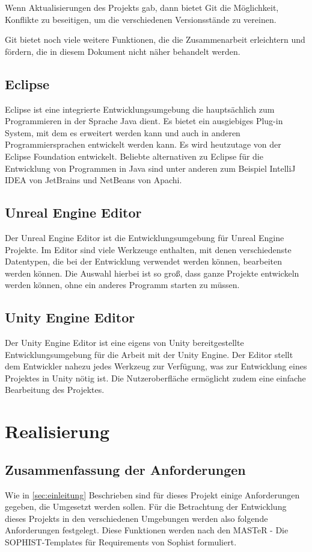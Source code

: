 \documentclass[
	12pt, %
	a4paper,
	listof=totoc, %
	bibliography=totoc, %
	numbers=noenddot, %
	ngerman, %
	headsepline, %
	oneside %
	]{scrbook} %
\begin{document}
Wenn Aktualisierungen des Projekts gab, dann bietet Git die Möglichkeit, Konflikte zu beseitigen, um die verschiedenen Versionsstände zu vereinen.

Git bietet noch viele weitere Funktionen, die die Zusammenarbeit erleichtern und fördern, die in diesem Dokument nicht näher behandelt werden.

\section{Eclipse}
Eclipse ist eine integrierte Entwicklungsumgebung die hauptsächlich zum Programmieren in der Sprache Java dient. Es bietet ein ausgiebiges Plug-in System, mit dem es erweitert werden kann und auch in anderen Programmiersprachen entwickelt werden kann.
Es wird heutzutage von der Eclipse Foundation entwickelt. Beliebte alternativen zu Eclipse für die Entwicklung von Programmen in Java sind unter anderen zum Beispiel IntelliJ IDEA von JetBrains und NetBeans von Apachi.

\section{Unreal Engine Editor}
Der Unreal Engine Editor ist die Entwicklungsumgebung für Unreal Engine Projekte. Im Editor sind viele Werkzeuge enthalten, mit denen verschiedenste Datentypen, die bei der Entwicklung verwendet werden können, bearbeiten werden können. 
Die Auswahl hierbei ist so groß, dass ganze Projekte entwickeln werden können, ohne ein anderes Programm starten zu müssen.


\section{Unity Engine Editor}
Der Unity Engine Editor ist eine eigens von Unity bereitgestellte Entwicklungsumgebung für die Arbeit mit der Unity Engine. Der Editor stellt dem Entwickler nahezu jedes Werkzeug zur Verfügung, was zur Entwicklung eines Projektes in Unity nötig ist. Die Nutzeroberfläche ermöglicht zudem eine einfache Bearbeitung des Projektes. 


\chapter{Realisierung}\label{sec:Realisierung}
\section{Zusammenfassung der Anforderungen}
Wie in \ref{sec:einleitung} Beschrieben sind für dieses Projekt einige Anforderungen gegeben, die Umgesetzt werden sollen. Für die Betrachtung der Entwicklung dieses Projekts in den verschiedenen Umgebungen werden also folgende Anforderungen festgelegt.
Diese Funktionen werden nach den \glqq MASTeR - Die SOPHIST-Templates für Requirements\grqq{} von Sophist formuliert\cite{sophist}.
\end{document}
